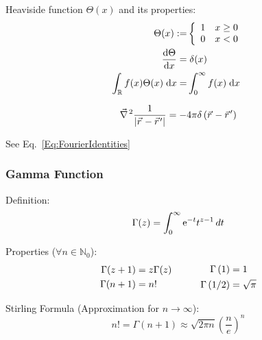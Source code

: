 			\noindent
			Heaviside function $\Theta(x)$ and its properties:
			\begin{equation}
				\begin{aligned}
					\Theta(x) :=& \left\{\begin{array}{ll}
						1 & x\ge 0 \\
						0 & x<0 \\
						\end{array}\right. \\
						\dv{\Theta}{x}(x) =&\; \delta(x) \\
					\int_{\mathbb{R}} f(x)\Theta(x)\;\dd x =& \int_{0}^{\infty} f(x)\;\dd x
				\end{aligned}
			\end{equation}

			\begin{equation}
				\Nabla^2\frac{1}{\abs{\vec{r} - \vec{r}'}} = -4\pi\delta\left(\vec{r} - \vec{r}'\right)
			\end{equation}

			\noindent
			See Eq.~\ref{Eq:FourierIdentities}

		\subsubsection{Gamma Function}
			\noindent
			Definition:
			\begin{equation}
				\Gamma(z)=\int_0^{\infty}\mathrm{e}^{-t}t^{z-1}\,dt
			\end{equation}

			\noindent
			Properties ($\forall n\in\mathbb{N}_0$):
			\begin{equation}
				\begin{aligned}
					\Gamma(z+1)&=z\Gamma(z) \\
					\Gamma(n+1) &= n!
				\end{aligned}
				\hspace{30pt}
				\begin{aligned}
					\Gamma\left(1 \right)&=1 \\
					\Gamma\left(1/2 \right)&=\sqrt{\pi} \\
				\end{aligned}
			\end{equation}

			\noindent
			Stirling Formula (Approximation for $n\rightarrow\infty$):
			\begin{equation}
				n! = \Gamma(n+1) \approx \sqrt{2\pi n} \left( \frac{n}{e} \right)^{n}
			\end{equation}


